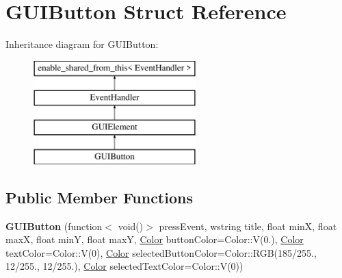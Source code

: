 \hypertarget{structGUIButton}{\section{G\+U\+I\+Button Struct Reference}
\label{structGUIButton}
}
Inheritance diagram for G\+U\+I\+Button\+:\begin{figure}[H]
\begin{center}
\leavevmode
\includegraphics[height=4.000000cm]{structGUIButton}
\end{center}
\end{figure}
\subsection*{Public Member Functions}
\begin{DoxyCompactItemize}
\item 
\hypertarget{structGUIButton_a99c6c7439eed6319a9b0c00c07b8adaa}{{\bfseries G\+U\+I\+Button} (function$<$ void()$>$ press\+Event, wstring title, float min\+X, float max\+X, float min\+Y, float max\+Y, \hyperlink{structColor}{Color} button\+Color=Color\+::\+V(0.), \hyperlink{structColor}{Color} text\+Color=Color\+::\+V(0), \hyperlink{structColor}{Color} selected\+Button\+Color=Color\+::\+R\+G\+B(185/255., 12/255., 12/255.), \hyperlink{structColor}{Color} selected\+Text\+Color=Color\+::\+V(0))}\label{structGUIButton_a99c6c7439eed6319a9b0c00c07b8adaa}

\end{DoxyCompactItemize}
